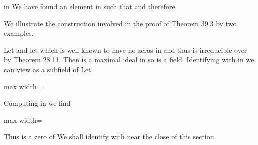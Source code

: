 \documentclass[11pt,oneside]{article}
\begin{document}
\begin{BookBody}

\noindent in  We have found an element \BookInline{\alpha } in  such that  and therefore \BookEnd{\blacklozenge}

We illustrate the construction involved in the proof of Theorem 39.3 by two examples.

 Let  and let  which is well known to have no zeros in  and thus is irreducible over  by Theorem 28.11. Then  is a maximal ideal in  so  is a field. Identifying  with  in  we can view  as a subfield of  Let

\begin{center}\begin{adjustbox}{max width=\linewidth}\end{adjustbox}\end{center}

Computing in  we find

\begin{center}\begin{adjustbox}{max width=\linewidth}\end{adjustbox}\end{center}

Thus \BookInline{\alpha } is a zero of  We shall identify  with  near the close of this section\BookEnd{\blacktriangle}


\end{BookBody}
\end{document}
